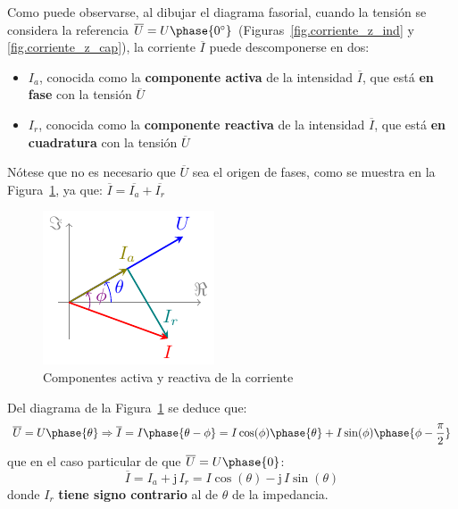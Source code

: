 \documentclass[11pt]{book} %
\numberwithin{dummy}{section}
\theoremstyle{ocrenumbox}
\theoremstyle{blacknumex}
\theoremstyle{blacknumbox}
\theoremstyle{ocrenum}
\newenvironment{remark}{\par\vspace{10pt}\small %
\begin{list}{}{
\leftmargin=35pt %
\rightmargin=25pt}\item\ignorespaces %
\makebox[-2.5pt]{\begin{tikzpicture}[overlay]
\node[draw=ocre!60,line width=1pt,circle,fill=ocre!25,font=\sffamily\bfseries,inner sep=2pt,outer sep=0pt] at (-15pt,0pt){\textcolor{ocre}{N}};\end{tikzpicture}} %
\advance\baselineskip -1pt}{\end{list}\vskip5pt} %
\newlength\esp
\begin{document}
	Como puede observarse, al dibujar el diagrama fasorial, cuando la tensión se considera la referencia $\overline{U}=U\phase{0^\circ}$ (Figuras~\ref{fig.corriente_z_ind} y \ref{fig.corriente_z_cap}), la corriente $\overline{I}$ puede descomponerse en dos:
	\begin{itemize}
		\item $I_a$, conocida como la  \textbf{componente activa} de la intensidad $\overline{I}$, que está \textbf{en fase} con la tensión $\overline{U}$
		\item $I_r$, conocida como la \textbf{componente reactiva} de la intensidad $\overline{I}$, que está \textbf{en cuadratura} con la tensión $\overline{U}$
	\end{itemize}
	
	\begin{remark}
		Nótese que no es necesario que $\overline{U}$ sea el origen de fases, como se muestra en la Figura~\ref{fig.corrientes_act_react}, ya que: $\overline{I}=\overline{I_a}+\overline{I_r}$
	\end{remark}
	
	\begin{figure}[htbp]
		\centering
		\includegraphics{../figs/corrientes_act_react.pdf}
		\caption{Componentes activa y reactiva de la corriente}
		\label{fig.corrientes_act_react}
	\end{figure}
	
	Del diagrama de la Figura~\ref{fig.corrientes_act_react} se deduce que: 
	\begin{equation*}
		\overline{U}=U\phase{\theta}\Rightarrow \overline{I}=I\phase{\theta-\phi}=I\cos(\phi)\phase{\theta}+I\sin(\phi)\phase{\phi-\frac{\pi}{2}}
	\end{equation*}
	que en el caso particular de que $\overline{U}=U\phase{0}$:
	\begin{equation*}
		\overline{I}=I_a+\mathrm{j}\,I_r=I\cos(\theta)-\mathrm{j}\,I\sin(\theta)
	\end{equation*}
	donde $I_r$ \textbf{tiene signo contrario} al de $\theta$ de la impedancia.
	
\end{document}
